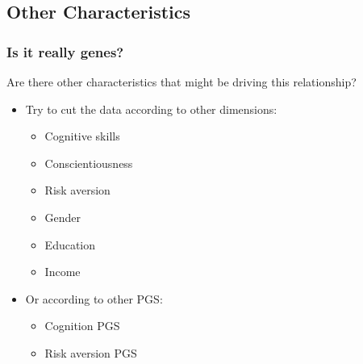 \documentclass[10pt,compress,xcolor=dvipsnames]{beamer}    %
\newcommand{\1}[1]{\mathrm{1\hspace*{-2.5pt}l}[#1]}	%
\begin{document}
\subsection[Split]{Other Characteristics}
\begin{frame} \label{frame:otherX}
\frametitle{Is it really genes?}
Are there other characteristics that might be driving this relationship?

\begin{itemize}
	\item Try to cut the data according to other dimensions:
	\begin{itemize}
		\item Cognitive skills 	\hyperlink{fig:cog}{\beamergotobutton{}}
		\item Conscientiousness \hyperlink{fig:consc}{\beamergotobutton{}}
		\item Risk aversion 	\hyperlink{fig:risk}{\beamergotobutton{}}
		\item Gender 			\hyperlink{fig:gender}{\beamergotobutton{}}
		\item Education 		\hyperlink{fig:edu}{\beamergotobutton{}}
		\item Income 			\hyperlink{fig:income}{\beamergotobutton{}}
	\end{itemize}

	\item Or according to other PGS:
	\begin{itemize}
		\item Cognition PGS 	\hyperlink{fig:cogPGS}{\beamergotobutton{}}
		\item Risk aversion PGS	\hyperlink{fig:riskPGS}{\beamergotobutton{}}
	\end{itemize}
\end{itemize}

\end{frame}
\end{document}
